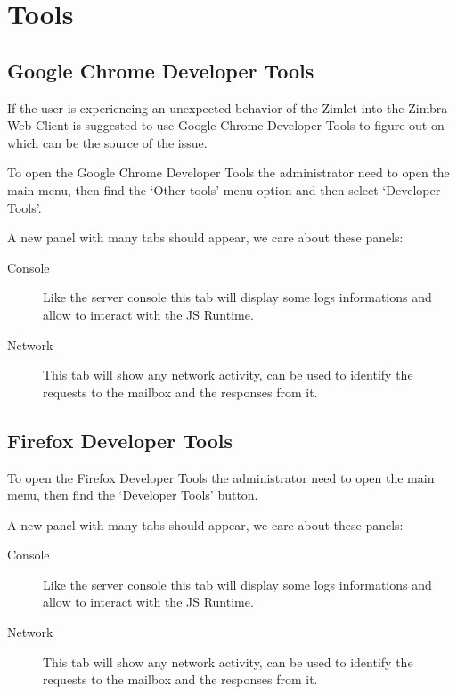 \section{Tools}
\label{sect:tools}

\subsection{Google Chrome Developer Tools}

    If the user is experiencing an unexpected behavior of the Zimlet into the Zimbra Web Client is suggested to use
    Google Chrome Developer Tools to figure out on which can be the source of the issue.

    To open the Google Chrome Developer Tools the administrator need to open the main menu, then find the `Other tools'
    menu option and then select `Developer Tools'.

    A new panel with many tabs should appear, we care about these panels:
    \begin{description}
        \item [Console] Like the server console this tab will display some logs informations and allow to interact with
            the JS Runtime.
        \item [Network] This tab will show any network activity, can be used to identify the requests to the mailbox and
            the responses from it.
    \end{description}

\subsection{Firefox Developer Tools}

    To open the Firefox Developer Tools the administrator need to open the main menu, then find the `Developer Tools'
    button.

    A new panel with many tabs should appear, we care about these panels:
    \begin{description}
        \item [Console] Like the server console this tab will display some logs informations and allow to interact with
            the JS Runtime.
        \item [Network] This tab will show any network activity, can be used to identify the requests to the mailbox and
            the responses from it.
    \end{description}

